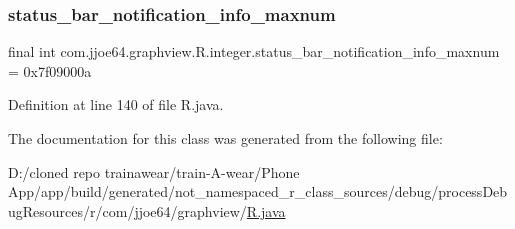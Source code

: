 \subsubsection{\texorpdfstring{status\_bar\_notification\_info\_maxnum}{status\_bar\_notification\_info\_maxnum}}
{\footnotesize\ttfamily final int com.\+jjoe64.\+graphview.\+R.\+integer.\+status\+\_\+bar\+\_\+notification\+\_\+info\+\_\+maxnum = 0x7f09000a\hspace{0.3cm}{\ttfamily [static]}}



Definition at line 140 of file R.\+java.



The documentation for this class was generated from the following file\+:\begin{DoxyCompactItemize}
\item 
D\+:/cloned repo trainawear/train-\/\+A-\/wear/\+Phone App/app/build/generated/not\+\_\+namespaced\+\_\+r\+\_\+class\+\_\+sources/debug/process\+Debug\+Resources/r/com/jjoe64/graphview/\mbox{\hyperlink{process_debug_resources_2r_2com_2jjoe64_2graphview_2_r_8java}{R.\+java}}\end{DoxyCompactItemize}
